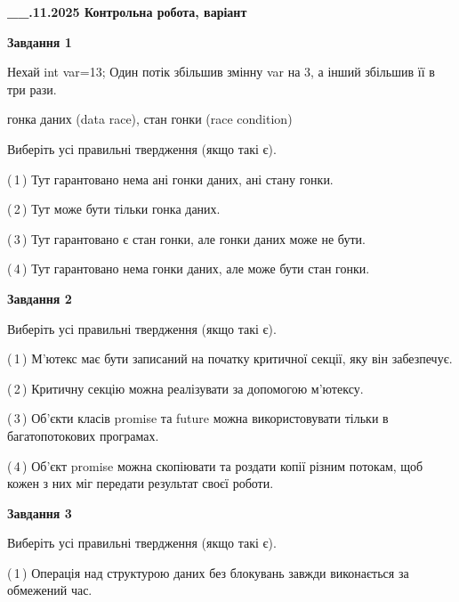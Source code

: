 \documentclass[12pt, ukrainian]{article}
\begin{document}
\begin {large}

\textbf{\_\_.11.2025 Контрольна робота, варіант  }\par


{

\begin{center}
\textbf{Завдання 1}
\end{center}
Нехай int var=13; Один потік збільшив змінну var на 3, а інший збільшив її в три рази.

гонка даних (data race), стан гонки (race condition)

Виберіть усі правильні твердження (якщо такі є).\par
\vspace{2mm}
(\,1\,) Тут гарантовано нема ані гонки даних, ані стану гонки.%

(\,2\,) Тут може бути тільки гонка даних.%

(\,3\,) Тут гарантовано є стан гонки, але гонки даних може не бути.%

(\,4\,) Тут гарантовано нема гонки даних, але може бути стан гонки.%



\begin{center}
\textbf{Завдання 2}
\end{center}
Виберіть усі правильні твердження (якщо такі є).\par
\vspace{2mm}

(\,1\,) М’ютекс має бути записаний на початку критичної секції, яку він забезпечує.%

(\,2\,) Критичну секцію можна реалізувати за допомогою м’ютексу.%

(\,3\,) Об’єкти класів promise та future можна використовувати тільки в багатопотокових програмах.%

(\,4\,) Об’єкт promise можна скопіювати та роздати копії різним потокам, щоб кожен з них міг передати результат своєї роботи.%



\begin{center}
\textbf{Завдання 3}
\end{center}
Виберіть усі правильні твердження (якщо такі є).\par
\vspace{2mm}

(\,1\,) Операція над структурою даних без блокувань завжди виконається за обмежений час.%

}
\end{large}
\end{document}
